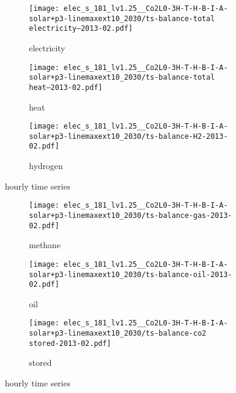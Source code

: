 \begin{figure}
    \centering
    \begin{subfigure}[t]{\textwidth}
        \centering
        \caption{electricity}
        \texttt{[image: elec\_s\_181\_lv1.25\_\_Co2L0-3H-T-H-B-I-A-solar+p3-linemaxext10\_2030/ts-balance-total electricity--2013-02.pdf]}
    \end{subfigure}
    \begin{subfigure}[t]{\textwidth}
        \centering
        \caption{heat}
        \texttt{[image: elec\_s\_181\_lv1.25\_\_Co2L0-3H-T-H-B-I-A-solar+p3-linemaxext10\_2030/ts-balance-total heat--2013-02.pdf]}
    \end{subfigure}
    \begin{subfigure}[t]{\textwidth}
        \centering
        \caption{hydrogen}
        \texttt{[image: elec\_s\_181\_lv1.25\_\_Co2L0-3H-T-H-B-I-A-solar+p3-linemaxext10\_2030/ts-balance-H2-2013-02.pdf]}
    \end{subfigure}
    \caption{hourly time series}
    \label{fig:eligibility}
\end{figure}

\begin{figure}
    \centering
    \begin{subfigure}[t]{\textwidth}
        \centering
        \caption{methane}
        \texttt{[image: elec\_s\_181\_lv1.25\_\_Co2L0-3H-T-H-B-I-A-solar+p3-linemaxext10\_2030/ts-balance-gas-2013-02.pdf]}
    \end{subfigure}
    \begin{subfigure}[t]{\textwidth}
        \centering
        \caption{oil}
        \texttt{[image: elec\_s\_181\_lv1.25\_\_Co2L0-3H-T-H-B-I-A-solar+p3-linemaxext10\_2030/ts-balance-oil-2013-02.pdf]}
    \end{subfigure}
    \begin{subfigure}[t]{\textwidth}
        \centering
        \caption{stored \co}
        \texttt{[image: elec\_s\_181\_lv1.25\_\_Co2L0-3H-T-H-B-I-A-solar+p3-linemaxext10\_2030/ts-balance-co2 stored-2013-02.pdf]}
    \end{subfigure}
    \caption{hourly time series}
    \label{fig:eligibility}
\end{figure}

